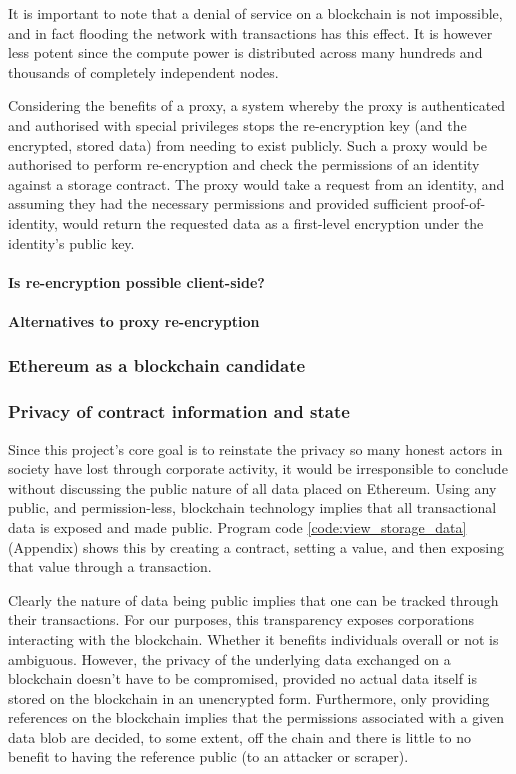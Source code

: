 It is important to note that a denial of service on a blockchain is not impossible, and in fact flooding the network with transactions has this effect. It is however less potent since the compute power is distributed across many hundreds and thousands of completely independent nodes.

Considering the benefits of a proxy, a system whereby the proxy is authenticated and authorised with special privileges stops the re-encryption key (and the encrypted, stored data) from needing to exist publicly. Such a proxy would be authorised to perform re-encryption and check the permissions of an identity against a storage contract. The proxy would take a request from an identity, and assuming they had the necessary permissions and provided sufficient proof-of-identity, would return the requested data as a first-level encryption under the identity's public key.

\paragraph{Is re-encryption possible client-side?}

\paragraph{Alternatives to proxy re-encryption}

\subsubsection{Ethereum as a blockchain candidate}

\subsubsection{Privacy of contract information and state}

Since this project's core goal is to reinstate the privacy so many honest actors in society have lost through corporate activity, it would be irresponsible to conclude without discussing the public nature of all data placed on Ethereum. Using any public, and permission-less, blockchain technology implies that all transactional data is exposed and made public. Program code \ref{code:view_storage_data} (Appendix) shows this by creating a contract, setting a value, and then exposing that value through a transaction.

Clearly the nature of data being public implies that one can be tracked through their transactions. For our purposes, this transparency exposes corporations interacting with the blockchain. Whether it benefits individuals overall or not is ambiguous. However, the privacy of the underlying data exchanged on a blockchain doesn't have to be compromised, provided no actual data itself is stored on the blockchain in an unencrypted form. Furthermore, only providing references on the blockchain implies that the permissions associated with a given data blob are decided, to some extent, off the chain and there is little to no benefit to having the reference public (to an attacker or scraper).

